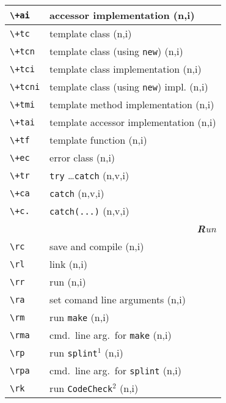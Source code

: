 \documentclass[oneside,11pt,landscape,DIV16]{scrartcl}
\begin{document}
\begin{multicols}{3}
\begin{center}
\begin{tabular}[]{|p{12mm}|p{62mm}|}
\hline \verb'\+ai'  & accessor implementation                 \hfill (n,i)\\
\hline \verb'\+tc'  & template class                          \hfill (n,i)\\
\hline \verb'\+tcn' & template class (using \verb'new')       \hfill (n,i)\\
\hline \verb'\+tci' & template class  implementation          \hfill (n,i)\\
\hline \verb'\+tcni'& template class (using \verb'new') impl. \hfill (n,i)\\
\hline \verb'\+tmi' & template method implementation          \hfill (n,i)\\
\hline \verb'\+tai' & template accessor implementation        \hfill (n,i)\\
\hline \verb'\+tf'  & template function                       \hfill (n,i)\\
\hline \verb'\+ec'  & error class                             \hfill (n,i)\\
\hline \verb'\+tr'  & \verb'try' \dots \verb'catch'           \hfill (n,v,i)\\
\hline \verb'\+ca'  & \verb'catch'                            \hfill (n,v,i)\\
\hline \verb'\+c.'  & \verb'catch(...)'                       \hfill (n,v,i)\\
\hline 
\hline
\multicolumn{2}{|r|}{\textsl{\textbf{R}un}} \\
\hline \verb'\rc'  & save and compile                        \hfill (n,i)\\
\hline \verb'\rl'  & link                                    \hfill (n,i)\\
\hline \verb'\rr'  & run                                     \hfill (n,i)\\
\hline \verb'\ra'  & set comand line arguments               \hfill (n,i)\\
\hline \verb'\rm'  & run \texttt{make}                       \hfill (n,i)\\
\hline \verb'\rma' & cmd.\ line arg.\ for \texttt{make}      \hfill (n,i)\\
%
\hline \verb'\rp'  & run \texttt{splint}$^1$     \hfill (n,i)\\
\hline \verb'\rpa' & cmd.\ line arg.\ for \texttt{splint}    \hfill (n,i)\\
%
\hline \verb'\rk'  & run \texttt{CodeCheck}$^2$  \hfill (n,i)\\

\end{tabular}
\end{center}
\end{multicols}
\end{document}
